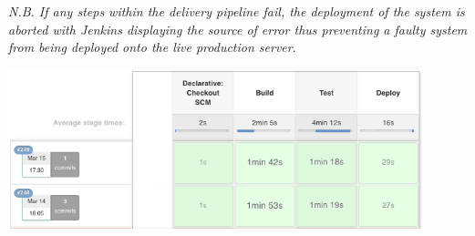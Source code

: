 \documentclass[11pt]{report}
\begin{document}
\textit{N.B. If any steps within the delivery pipeline fail, the deployment of the system is aborted with Jenkins displaying the source of error thus preventing a faulty system from being deployed onto the live production server}.

\begin{center}
  \includegraphics[width=0.9\textwidth]{images/delivery-pipeline.png}
  \label{figure:deliverypipe}
\end{center}
\end{document}
